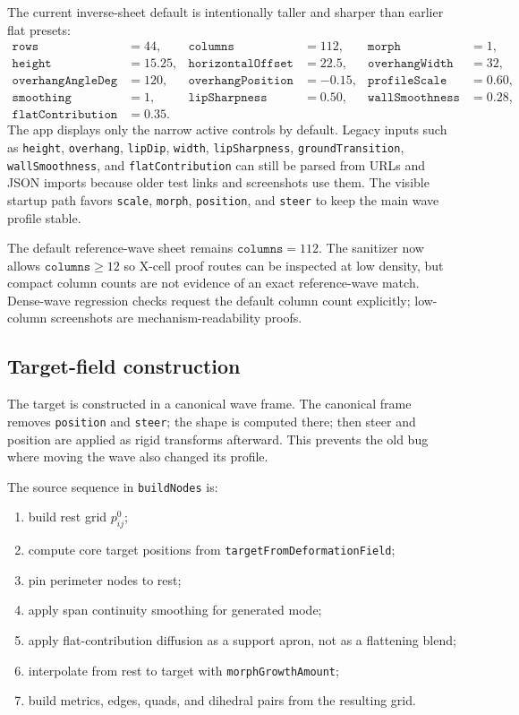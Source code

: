 \documentclass[12pt,letterpaper]{article}
\newcommand{\code}[1]{\texttt{#1}}
\begin{document}
The current inverse-sheet default is intentionally taller and sharper than earlier flat presets:
\[
\begin{aligned}
\code{rows}&=44,&
\code{columns}&=112,&
\code{morph}&=1,\\
\code{height}&=15.25,&
\code{horizontalOffset}&=22.5,&
\code{overhangWidth}&=32,\\
\code{overhangAngleDeg}&=120,&
\code{overhangPosition}&=-0.15,&
\code{profileScale}&=0.60,\\
\code{smoothing}&=1,&
\code{lipSharpness}&=0.50,&
\code{wallSmoothness}&=0.28,\\
\code{flatContribution}&=0.35.
\end{aligned}
\]
The app displays only the narrow active controls by default. Legacy inputs such as \code{height}, \code{overhang}, \code{lipDip}, \code{width}, \code{lipSharpness}, \code{groundTransition}, \code{wallSmoothness}, and \code{flatContribution} can still be parsed from URLs and JSON imports because older test links and screenshots use them. The visible startup path favors \code{scale}, \code{morph}, \code{position}, and \code{steer} to keep the main wave profile stable.

The default reference-wave sheet remains \(\code{columns}=112\). The sanitizer now allows \(\code{columns}\ge 12\) so X-cell proof routes can be inspected at low density, but compact column counts are not evidence of an exact reference-wave match. Dense-wave regression checks request the default column count explicitly; low-column screenshots are mechanism-readability proofs.

\subsection{Target-field construction}

The target is constructed in a canonical wave frame. The canonical frame removes \code{position} and \code{steer}; the shape is computed there; then steer and position are applied as rigid transforms afterward. This prevents the old bug where moving the wave also changed its profile.

The source sequence in \code{buildNodes} is:
\begin{enumerate}
  \item build rest grid \(p^0_{ij}\);
  \item compute core target positions from \code{targetFromDeformationField};
  \item pin perimeter nodes to rest;
  \item apply span continuity smoothing for generated mode;
  \item apply flat-contribution diffusion as a support apron, not as a flattening blend;
  \item interpolate from rest to target with \code{morphGrowthAmount};
  \item build metrics, edges, quads, and dihedral pairs from the resulting grid.
\end{enumerate}
\end{document}
